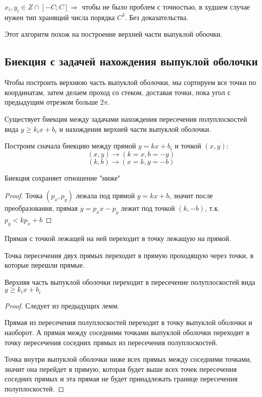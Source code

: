 \begin{lemma}
$x_i, y_i \in Z \cap [-C;C] \Rightarrow$ чтобы не было проблем с точностью, в худшем случае нужен тип хранящий числа порядка $C^3$. Без доказательства.
\end{lemma}

Этот алгоритм похож на построение верхней части выпуклой обоочки.

\subsection{Биекция с задачей нахождения выпуклой оболочки}
Чтобы построить верхнюю часть выпуклой оболочки, мы сортируем все точки по координатам, затем делаем проход со стеком, доставая точки, пока угол с предыдущим отрезком больше $2\pi$.

\begin{theorem}

Существует биекция между задачами нахождения пересечения полуплоскостей вида $y \ge k_i x + b_i$ и нахождения верхней части выпуклой оболочки.
\end{theorem}

Построим сначала биекцию между прямой $y = k x + b_i$ и точкой $(x,y)$:
$$(x, y) \rightarrow (k=x, b=-y)$$
$$(k, b) \rightarrow (x=k, y=-b)$$

\begin{lemma}
Биекция сохраняет отношение "ниже"
\end{lemma}
\begin{proof}
Точка $(p_x,p_y)$ лежала под прямой $y=kx+b$, значит после преобразования, прямая $y=p_x x-p_y$ лежит под точкой $(k,-b)$, т.к. $p_y < k p_x+b$
\end{proof}

\begin{lemma}
Прямая с точкой лежащей на ней переходит в точку лежащую на прямой.
\end{lemma}

\begin{lemma}
Точка пересечения двух прямых переходит в прямую проходящую через точки, в которые перешли прямые.
\end{lemma}

\begin{lemma}
Верхняя часть выпуклой оболочки переходит в пересечение полуплоскостей вида $y \ge k_i x + b_i$
\end{lemma}
\begin{proof}
Следует из предыдущих лемм.

Прямая из пересечения полуплоскостей переходит в точку выпуклой оболочки и наоборот. А прямая между соседними точками выпуклой оболочки переходит в точку пересечения соседних прямых из пересечения полуплоскостей.

Точка внутри выпуклой оболочки ниже всех прямых между соседними точками, значит она перейдет в прямую, которая будет выше всех точек пересечения соседних прямых и эта прямая не будет принадлежать границе пересечения полуплоскостей.
\end{proof}

